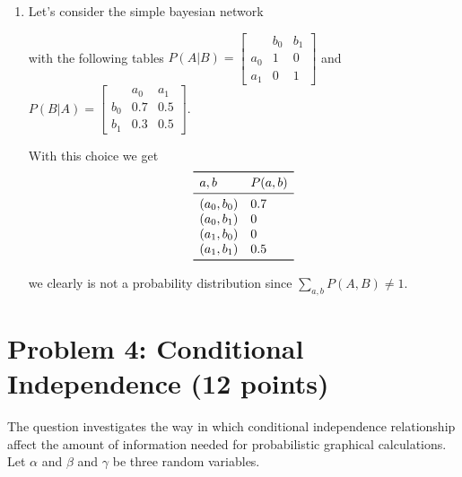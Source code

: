 \documentclass[10pt]{article}
\begin{document}
\begin{enumerate}[label=(\alph*)]
\item Let's consider the simple bayesian network

  \begin{center}
  \end{center}

with the following tables $P(A|B) = \begin{bmatrix} & b_0 & b_1\\ a_0 & 1 & 0\\
  a_1 & 0 & 1  \end{bmatrix}$ and $P(B|A) = \begin{bmatrix} & a_0 & a_1\\ b_0 & 0.7 & 0.5\\
  b_1 & 0.3 & 0.5  \end{bmatrix}$.

With this choice we get
$$
\begin{array}{ll}
  \toprule
  a,b & P(a,b) \\
  \midrule
  (a_0,b_0) &  0.7\\
  (a_0,b_1) &   0 \\
  (a_1,b_0) &   0 \\
  (a_1,b_1) &   0.5\\
  \bottomrule
  \end{array}
$$

we clearly is not a probability distribution since $\sum_{a,b} P(A,B) \neq 1$.
  \end{enumerate}
\section{Problem 4: Conditional Independence (12 points)}

The question investigates the way  in which  conditional independence
relationship affect the amount of information needed for probabilistic
graphical calculations. Let $\alpha$ and $\beta$ and $\gamma$ be three random
variables.
\end{document}
